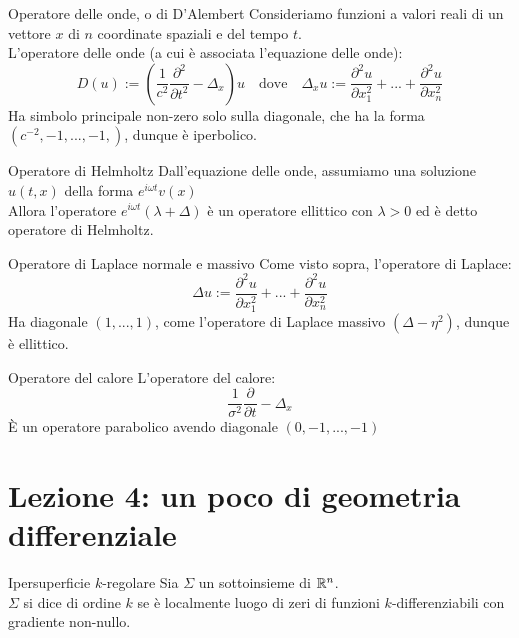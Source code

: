 \documentclass{article}
\begin{document}
\begin{example}{Operatore delle onde, o di D'Alembert}{}
    Consideriamo funzioni a valori reali di un vettore $x$ di $n$ coordinate spaziali e del tempo $t$.\\
    L'operatore delle onde (a cui è associata l'equazione delle onde):
    \[ D(u) := \left(\frac{1}{c^2}\frac{\partial^2}{\partial t^2} - \Delta_x\right) u \quad \text{dove}\quad \Delta_x u := \frac{\partial^2 u}{\partial x_1^2} +...+ \frac{\partial^2 u}{\partial x_n^2}\]
    Ha simbolo principale non-zero solo sulla diagonale, che ha la forma $(c^{-2},-1,...,-1,)$, dunque è iperbolico.
\end{example}

\begin{example}{Operatore di Helmholtz}{}
    Dall'equazione delle onde, assumiamo una soluzione $u(t,x)$ della forma $e^{i\omega t}v(x)$\\
    Allora l'operatore $e^{i\omega t}(\lambda + \Delta)$ è un operatore ellittico con $\lambda>0$ ed è detto operatore di Helmholtz.
\end{example}

\begin{example}{Operatore di Laplace normale e massivo}{}
    Come visto sopra, l'operatore di Laplace:
    \[\Delta u := \frac{\partial^2 u}{\partial x_1^2} +...+ \frac{\partial^2 u}{\partial x_n^2}\]
    Ha diagonale $(1,...,1)$, come l'operatore di Laplace massivo $(\Delta - \eta^2)$, dunque è ellittico.
\end{example}

\begin{example}{Operatore del calore}{}
    L'operatore del calore:
    \[\frac{1}{\sigma^2} \frac{\partial}{\partial t} - \Delta_x\]
    È un operatore parabolico avendo diagonale $(0,-1,...,-1)$
\end{example}

\section{Lezione 4: un poco di geometria differenziale}

\begin{definition}{Ipersuperficie $k$-regolare}{}
    Sia $\Sigma$ un sottoinsieme di $\mathbb{R}^n$.\\
    $\Sigma$ si dice  di ordine $k$ se è localmente luogo di zeri di funzioni $k$-differenziabili con gradiente non-nullo.
\end{definition}
\end{document}
